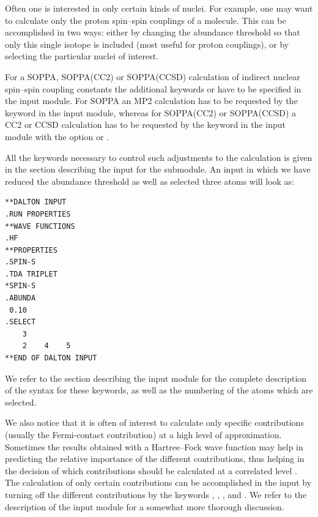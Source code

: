 Often one is interested in only certain kinds of nuclei. For example,
 one may want to calculate only the proton spin--spin couplings of a molecule.
This can be accomplished in two ways: either by changing the abundance
threshold so that only this single isotope is included (most useful
for proton couplings), or by selecting the particular nuclei of interest.

For a SOPPA, SOPPA(CC2) or
SOPPA(CCSD) calculation of indirect nuclear
spin--spin coupling constants the additional keywords  or
 have to be specified in the  input
module. For SOPPA an MP2 calculation has to be requested by the keyword
 in the  input module, whereas for
SOPPA(CC2) or SOPPA(CCSD) a CC2 or CCSD calculation has to be requested
by the keyword  in the  input module with the  option
 or .

All the keywords necessary to control such adjustments to the
calculation is given in the section describing the input for the
 submodule. An input in which we  have reduced the
abundance threshold as well as selected three atoms will look as:

\begin{verbatim}
**DALTON INPUT
.RUN PROPERTIES
**WAVE FUNCTIONS
.HF
**PROPERTIES
.SPIN-S
.TDA TRIPLET
*SPIN-S
.ABUNDA
 0.10
.SELECT
    3
    2    4    5
**END OF DALTON INPUT
\end{verbatim}

We refer to the section describing the  input module for
the complete description of the syntax for these keywords, as well as
the numbering of the atoms which are selected.

We also notice that it is often of interest to calculate only specific
contributions (usually the Fermi-contact contribution) at a high level
of approximation. Sometimes the results obtained with a Hartree--Fock
wave function may help in predicting the relative importance of the different
contributions, thus helping in the decision of which contributions
should be calculated at a correlated level \cite{krthklbpjcpl226}.
The calculation of only certain contributions can be accomplished in
the input by turning off the different
contributions by the keywords , ,
, and . We refer to the description of the
 input module for a somewhat more thorough discussion.

